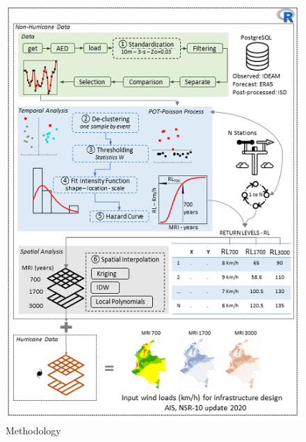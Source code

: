 \documentclass[12pt,oneside]{reedthesis}
\begin{document}
\footnotesize
\begin{figure}

{\centering \includegraphics[width=6.47in]{figure/methodology} 

}

\caption{Methodology}\label{fig:methodology}
\end{figure}
\normalsize
\end{document}
